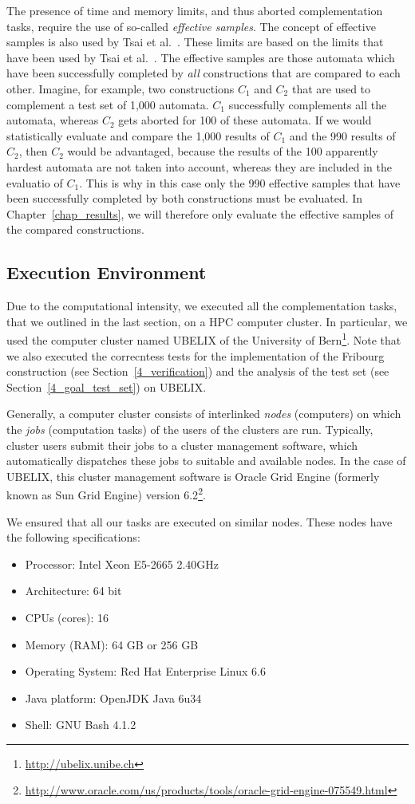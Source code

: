 The presence of time and memory limits, and thus aborted complementation tasks, require the use of so-called \textit{effective samples}. The concept of effective samples is also used by Tsai et al.~. These limits are based on the limits that have been used by Tsai et al.~\cite{2011_tsai}. The effective samples are those automata which have been successfully completed by \textit{all} constructions that are compared to each other. Imagine, for example, two constructions $C_1$ and $C_2$ that are used to complement a test set of 1,000 automata. $C_1$ successfully complements all the automata, whereas $C_2$ gets aborted for 100 of these automata. If we would statistically evaluate and compare the 1,000 results of $C_1$ and the 990 results of $C_2$, then $C_2$ would be advantaged, because the results of the 100 apparently hardest automata are not taken into account, whereas they are included in the evaluatio of $C_1$. This is why in this case only the 990 effective samples that have been successfully completed by both constructions must be evaluated. In Chapter~\ref{chap_results}, we will therefore only evaluate the effective samples of the compared constructions.


\subsection{Execution Environment}
\label{4_exec_env}
Due to the computational intensity, we executed all the complementation tasks, that we outlined in the last section, on a HPC computer cluster. In particular, we used the computer cluster named UBELIX of the University of Bern\footnote{\url{http://ubelix.unibe.ch}}. Note that we also executed the correcntess tests for the implementation of the Fribourg construction (see Section~\ref{4_verification}) and the analysis of the \goal{} test set (see Section~\ref{4_goal_test_set}) on UBELIX.

Generally, a computer cluster consists of interlinked \textit{nodes} (computers) on which the \textit{jobs} (computation tasks) of the users of the clusters are run. Typically, cluster users submit their jobs to a cluster management software, which automatically dispatches these jobs to suitable and available nodes. In the case of UBELIX, this cluster management software is Oracle Grid Engine (formerly known as Sun Grid Engine) version 6.2\footnote{\url{http://www.oracle.com/us/products/tools/oracle-grid-engine-075549.html}}.

We ensured that all our tasks are executed on similar nodes. These nodes have the following specifications:
\begin{itemize}
\item Processor: Intel Xeon E5-2665 2.40GHz
\item Architecture: 64 bit
\item CPUs (cores): 16
\item Memory (RAM): 64 GB or 256 GB
\item Operating System: Red Hat Enterprise Linux 6.6
\item Java platform: OpenJDK Java 6u34
\item Shell: GNU Bash 4.1.2
\end{itemize}

